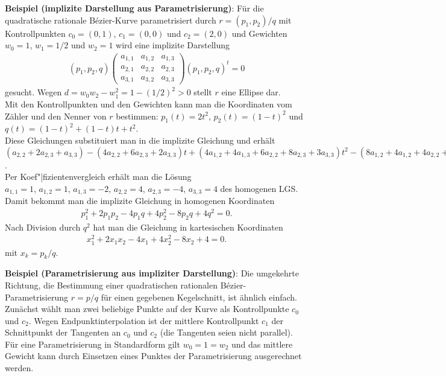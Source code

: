 \textbf{Beispiel (implizite Darstellung aus Parametrisierung)}:
Für die quadratische rationale Bézier-Kurve parametrisiert durch $r = (p_1, p_2)/q$ mit
Kontrollpunkten $c_0 = (0, 1)$, $c_1 = (0, 0)$ und $c_2 = (2, 0)$ und Gewichten
$w_0 = 1$, $w_1 = 1/2$ und $w_2 = 1$ wird eine implizite Darstellung
\begin{align*}
    (p_1, p_2, q) \begin{pmatrix}a_{1,1} & a_{1,2} & a_{1,3}\\a_{2,1} & a_{2,2} & a_{2,3}\\
    a_{3,1} & a_{3,2} & a_{3,3}\end{pmatrix} (p_1, p_2, q)^t = 0
\end{align*}
gesucht.
Wegen $d = w_0 w_2 - w_1^2 = 1 - (1/2)^2 > 0$ stellt $r$ eine Ellipse dar.\\
Mit den Kontrollpunkten und den Gewichten kann man die Koordinaten vom Zähler und den Nenner
von $r$ bestimmen:
$p_1(t) = 2t^2$, $p_2(t) = (1 - t)^2$ und
$q(t) = (1 - t)^2 + (1 - t) t + t^2$.\\
Diese Gleichungen substituiert man in die implizite Gleichung und erhält
$(a_{2,2} + 2a_{2,3} + a_{3,3}) - (4a_{2,2} + 6a_{2,3} + 2a_{3,3}) t +
(4a_{1,2} + 4a_{1,3} + 6a_{2,2} + 8a_{2,3} + 3a_{3,3}) t^2 -
(8a_{1,2} + 4a_{1,2} + 4a_{2,2} + 6a_{2,3} + 2a_{3,3}) t^3 +
(4a_{1,1} + 4a_{1,2} + 4a_{1,3} + a_{2,2} + 2a_{2,3} + a_{3,3}) t^4 = 0$.\\
Per Koef"|fizientenvergleich erhält man die Lösung\\
$a_{1,1} = 1$, $a_{1,2} = 1$, $a_{1,3} = -2$, $a_{2,2} = 4$, $a_{2,3} = -4$, $a_{3,3} = 4$
des homogenen LGS.\\
Damit bekommt man die implizite Gleichung in homogenen Koordinaten
\begin{align*}
    p_1^2 + 2p_1p_2 - 4p_1q + 4p_2^2 - 8p_2q + 4q^2 = 0.
\end{align*}
Nach Division durch $q^2$ hat man die Gleichung in kartesischen Koordinaten
\begin{align*}
    x_1^2 + 2x_1x_2 - 4x_1 + 4x_2^2 - 8x_2 + 4 = 0.
\end{align*}
mit $x_k = p_k/q$.

\linie

\textbf{Beispiel (Parametrisierung aus impliziter Darstellung)}:
Die umgekehrte Richtung, die Bestimmung einer quadratischen rationalen Bézier-Parametrisierung
$r = p/q$ für einen gegebenen Kegelschnitt, ist ähnlich einfach.
Zunächst wählt man zwei beliebige Punkte auf der Kurve als Kontrollpunkte $c_0$ und $c_2$.
Wegen Endpunktinterpolation ist der mittlere Kontrollpunkt $c_1$ der Schnittpunkt der Tangenten
an $c_0$ und $c_2$ (die Tangenten seien nicht parallel).
Für eine Parametrisierung in Standardform gilt $w_0 = 1 = w_2$ und das mittlere Gewicht kann
durch Einsetzen eines Punktes der Parametrisierung ausgerechnet werden.

